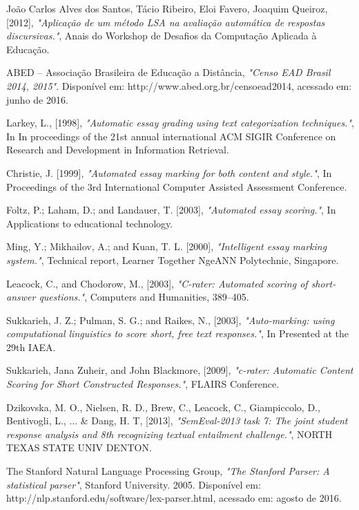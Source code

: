 \documentclass[conference]{IEEEtran}
\begin{document}
\begin{thebibliography}{1}

João Carlos Alves dos Santos, Tácio Ribeiro, Eloi Favero, Joaquim Queiroz, [2012], \emph{"Aplicação de um método LSA na avaliação automática de respostas discursivas."}, Anais do Workshop de Desafios da Computação Aplicada à Educação.

ABED – Associação Brasileira de Educação a Distância, \emph{"Censo EAD Brasil
2014, 2015"}. Disponível em: http://www.abed.org.br/censoead2014, acessado em: junho de 2016.

Larkey, L., [1998], \emph{"Automatic essay grading using text categorization
techniques."}, In In proceedings of the 21st annual international ACM SIGIR Conference on Research and Development in Information Retrieval.

Christie, J. [1999], \emph{"Automated essay marking for both content and style."}, In Proceedings of the 3rd International Computer Assisted Assessment Conference.

Foltz, P.; Laham, D.; and Landauer, T. [2003], \emph{"Automated essay scoring."}, In Applications to educational technology.

Ming, Y.; Mikhailov, A.; and Kuan, T. L. [2000], \emph{"Intelligent
essay marking system."}, Technical report, Learner Together NgeANN Polytechnic, Singapore.

Leacock, C., and Chodorow, M., [2003], \emph{"C-rater: Automated
scoring of short-answer questions."}, Computers and Humanities, 389–405.

Sukkarieh, J. Z.; Pulman, S. G.; and Raikes, N., [2003], \emph{"Auto-marking: using computational linguistics to score short, free text responses."}, In Presented at the 29th IAEA.

Sukkarieh, Jana Zuheir, and John Blackmore, [2009], \emph{"c-rater: Automatic Content Scoring for Short Constructed Responses."}, FLAIRS Conference.

Dzikovska, M. O., Nielsen, R. D., Brew, C., Leacock, C., Giampiccolo, D.,
Bentivogli, L., ... \& Dang, H. T, [2013], \emph{"SemEval-2013 task 7: The joint student response analysis and 8th recognizing textual entailment challenge."}, NORTH TEXAS STATE UNIV DENTON.

The Stanford Natural Language Processing Group, \emph{"The Stanford Parser: A statistical parser"}, Stanford University. 2005. Disponível em: http://nlp.stanford.edu/software/lex-parser.html, acessado em: agosto de 2016.


\end{thebibliography}
\end{document}

